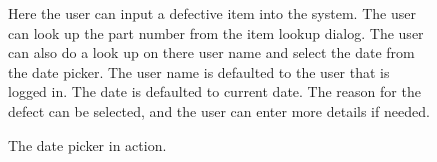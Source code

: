 \documentclass[16pt]{report}
\begin{document}
\begin{figure}[h!]
\caption{Here the user can input a defective item into the system.  The user can look up the part number from the item lookup dialog.  The user can also do a look up on there user name and select the date from the date picker.  The user name is defaulted to the user that is logged in.  The date is defaulted to current date.  The reason for the defect can be selected, and the user can enter more details if needed.}
\end{figure}

\begin{figure}[h!]
\caption{The date picker in action.}
\end{figure}
\end{document}
